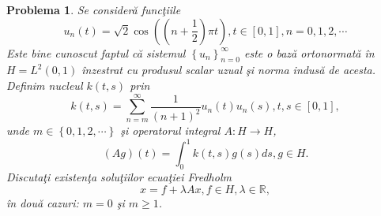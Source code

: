 \documentclass[a4paper,12pt,oneside]{report}
\newtheorem{problem}{Problema}
\begin{document}
\begin{problem}
Se consider\u{a} func\c{t}iile
\begin{displaymath}
  u_{n}\left ( t \right ) = \sqrt{2} \cos \left ( \left ( n+ \frac{1}{2} \right )\pi t \right ), t \in\left [ 0,1 \right ], n = 0,1,2,\cdots
\end{displaymath}
Este bine cunoscut faptul c\u{a} sistemul \(\left \{ u_{n} \right \}_{n=0}^{\infty }\) este o baz\u{a} ortonormat\u{a} \^{i}n \(H  = L^{2} \left ( 0,1 \right )\) \^{i}nzestrat cu produsul scalar uzual \c{s}i norma indus\u{a} de acesta. Definim nucleul \(k\left ( t,s \right )\) prin
\begin{displaymath}
  k\left ( t,s \right ) = \sum_{n=m}^{\infty } \frac{1}{\left ( n+1 \right )^{2}}u_{n}\left ( t \right )u_{n}\left ( s \right ), t,s \in \left [ 0,1 \right ],
\end{displaymath}
unde \(m \in \left \{ 0,1,2,\cdots\right \}\) \c{s}i  operatorul integral \(A : H \rightarrow H\),
\begin{displaymath}
  \left ( Ag \right )\left ( t \right ) = \int_{0}^{1} k\left ( t,s \right )g\left ( s \right )ds, g \in H.
\end{displaymath}
Discuta\c{t}i existen\c{t}a solu\c{t}iilor ecua\c{t}iei Fredholm
\begin{displaymath}
  x = f + \lambda Ax, f \in H, \lambda \in \mathbb{R},
\end{displaymath}
\^{i}n dou\u{a} cazuri: \(m = 0\) \c{s}i \(m \geq 1\).
\end{problem}
  	
\end{document}
